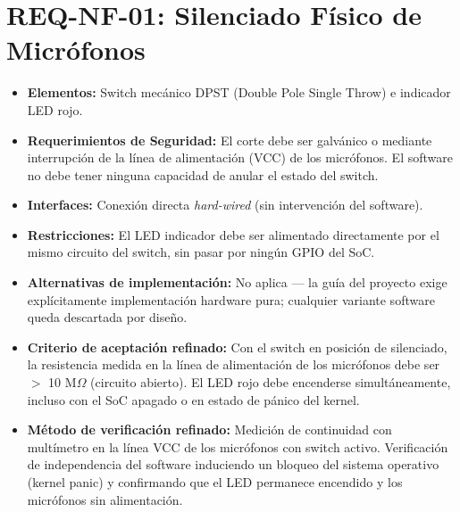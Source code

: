 \documentclass[%
	paper=a4,
	twoside=false,
	parskip=half,
	chapterprefix=false,
	10pt,
	headings=normal,
	bibliography=totoc,
	listof=totoc,
	titlepage=on,
	captions=tableabove,
	draft=false,
]{scrbook}%
\begin{document}
\section{REQ-NF-01: Silenciado Físico de Micrófonos}
\begin{itemize}
    \item \textbf{Elementos:} Switch mecánico DPST (Double Pole Single Throw) e indicador LED rojo.
    \item \textbf{Requerimientos de Seguridad:} El corte debe ser galvánico o mediante interrupción de la línea de alimentación (VCC) de los micrófonos. El software no debe tener ninguna capacidad de anular el estado del switch.
    \item \textbf{Interfaces:} Conexión directa \textit{hard-wired} (sin intervención del software).
    \item \textbf{Restricciones:} El LED indicador debe ser alimentado directamente por el mismo circuito del switch, sin pasar por ningún GPIO del SoC.
    \item \textbf{Alternativas de implementación:} No aplica — la guía del proyecto exige explícitamente implementación hardware pura; cualquier variante software queda descartada por diseño.
    \item \textbf{Criterio de aceptación refinado:} Con el switch en posición de silenciado, la resistencia medida en la línea de alimentación de los micrófonos debe ser $>$ 10 M$\Omega$ (circuito abierto). El LED rojo debe encenderse simultáneamente, incluso con el SoC apagado o en estado de pánico del kernel.
    \item \textbf{Método de verificación refinado:} Medición de continuidad con multímetro en la línea VCC de los micrófonos con switch activo. Verificación de independencia del software induciendo un bloqueo del sistema operativo (kernel panic) y confirmando que el LED permanece encendido y los micrófonos sin alimentación.
\end{itemize}

\end{document}
